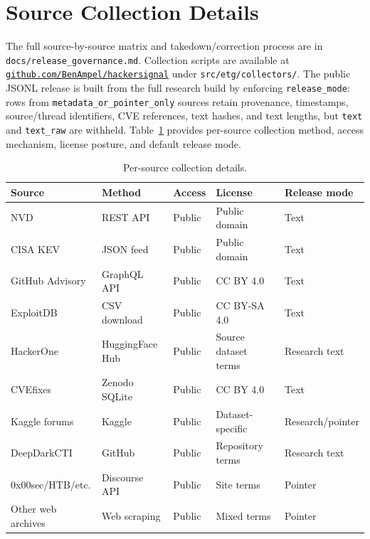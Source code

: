 \documentclass{article}
\begin{document}
\appendix

\section{Source Collection Details}
\label{app:collection}

The full source-by-source matrix and takedown/correction process are in \texttt{docs/release\_governance.md}. Collection scripts are available at \href{https://github.com/BenAmpel/hackersignal}{\texttt{github.com/BenAmpel/hackersignal}} under \texttt{src/etg/collectors/}. The public JSONL release is built from the full research build by enforcing \texttt{release\_mode}: rows from \texttt{metadata\_or\_pointer\_only} sources retain provenance, timestamps, source/thread identifiers, CVE references, text hashes, and text lengths, but \texttt{text} and \texttt{text\_raw} are withheld. Table~\ref{tab:collection-details} provides per-source collection method, access mechanism, license posture, and default release mode.

\begin{table}[t]
\centering
\small
\caption{Per-source collection details.}
\label{tab:collection-details}
\begin{tabular}{lllll}
\toprule
\textbf{Source} & \textbf{Method} & \textbf{Access} & \textbf{License} & \textbf{Release mode} \\
\midrule
NVD             & REST API        & Public & Public domain & Text \\
CISA KEV        & JSON feed       & Public & Public domain & Text \\
GitHub Advisory & GraphQL API     & Public & CC BY 4.0 & Text \\
ExploitDB       & CSV download    & Public & CC BY-SA 4.0 & Text \\
HackerOne       & HuggingFace Hub & Public & Source dataset terms & Research text \\
CVEfixes        & Zenodo SQLite   & Public & CC BY 4.0 & Text \\
Kaggle forums   & Kaggle          & Public & Dataset-specific & Research/pointer \\
DeepDarkCTI     & GitHub          & Public & Repository terms & Research text \\
0x00sec/HTB/etc.& Discourse API   & Public & Site terms & Pointer \\
Other web archives & Web scraping & Public & Mixed terms & Pointer \\
\bottomrule
\end{tabular}
\end{table}
\end{document}
